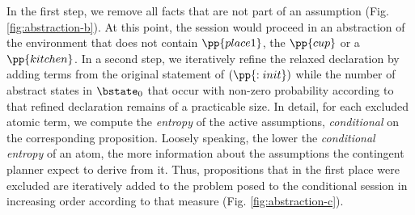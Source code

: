\documentclass{article}
\begin{document}





In the first step, we remove all facts that are not part of an
assumption (Fig. \ref{fig:abstraction-b}). At this point, the session
would proceed in an abstraction of the environment that does not
contain $\pp{place1}$, the $\pp{cup}$ or a $\pp{kitchen}$. 
In a second step, we iteratively refine the relaxed declaration by
adding terms from the original statement of $(\pp{:init})$ while the
number of abstract states in $\bstate_0$ that occur with non-zero
probability according to that refined declaration remains of a
practicable size. In detail, for each excluded atomic term, we compute
the {\em entropy} of the active assumptions, {\em conditional} on the
corresponding proposition.  Loosely speaking, the lower the {\em
  conditional entropy} of an atom, the more information about the
assumptions the contingent planner expect to derive from it. Thus,
propositions that in the first place were excluded are iteratively
added to the problem posed to the conditional session in increasing
order according to that measure (Fig. \ref{fig:abstraction-c}).


\end{document}
